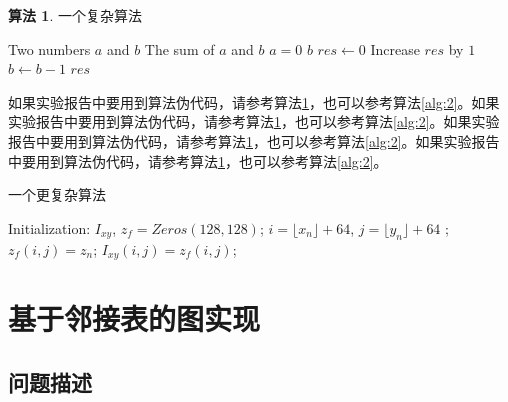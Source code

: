 \documentclass[supercite]{HustGraduPaper}
\theoremstyle{definition}
\newtheorem{alg}{算法}[section]
\begin{document}
    \begin{shaded*}
        \begin{alg}{一个复杂算法}
            \label{alg:1}
            \begin{algorithmic}
                \Input Two numbers $a$ and $b$
                \Output The sum of $a$ and $b$
                    \If
                        $a = 0$
                        \State \Return $b$
                    \EndIf
                    \State $res \gets 0$
                        \State Increase $res$ by $1$
                        \State $b \gets b - 1$
                    \EndWhile
                    \State \Return $res$
                \EndProcedure
            \end{algorithmic}
        \end{alg}
    \end{shaded*}

    如果实验报告中要用到算法伪代码，请参考算法\ref{alg:1}，也可以参考算法\ref{alg:2}。如果实验报告中要用到算法伪代码，请参考算法\ref{alg:1}，也可以参考算法\ref{alg:2}。如果实验报告中要用到算法伪代码，请参考算法\ref{alg:1}，也可以参考算法\ref{alg:2}。如果实验报告中要用到算法伪代码，请参考算法\ref{alg:1}，也可以参考算法\ref{alg:2}。

    \begin{algorithm}[h]
        \caption{一个更复杂算法}
        \begin{algorithmic}[1]
            \State Initialization: $I_{xy}$, $z_{f}=Zeros(128, 128)$;
                \State $i=\lfloor x_n \rfloor+64$, $j=\lfloor y_n \rfloor + 64$
                    ;
                    \State $z_{f}(i,j)=z_n$;
                \EndIf
                \State $I_{xy}(i,j)=z_{f}(i,j)$;
            \EndFor
        \end{algorithmic}\label{alg:2}
    \end{algorithm}

    \newpage


    \section{基于邻接表的图实现}

    \subsection{问题描述}
\end{document}
